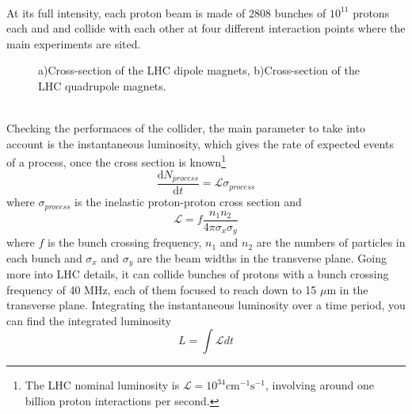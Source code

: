 \\
At its full intensity, each proton beam is made of 2808 bunches of $10^{11}$ protons each and and collide with each other at four different interaction points where the main experiments are sited.
\vspace{0.3cm}
\begin{figure}[t]
\caption{a)Cross-section of the LHC dipole magnets, b)Cross-section of the LHC quadrupole magnets.}
\end{figure}
\\Checking the performaces of the collider, the main parameter to take into account is the instantaneous luminosity, which gives the rate of expected events of a process, once the cross section is known\footnote{The LHC nominal luminosity is $\mathcal{L} = 10^{34}\text{cm}^{-1}\text{s}^{-1}$, involving around one billion proton interactions per second.}
\begin{equation}
\frac{\text{d}N_{process}}{\text{d}t} = \mathcal{L}\sigma_{process}
\end{equation}
where $\sigma_{process}$ is the inelastic proton-proton cross section and
\begin{equation}
\mathcal{L} = f \frac{n_1n_2}{4\pi \sigma_x\sigma_y}
\end{equation}
where $f$ is the bunch crossing frequency, $n_1$ and $n_2$ are the numbers of particles in each bunch and $\sigma_x$ and $\sigma_y$ are the beam widths in the transverse plane.
Going more into LHC details, it can collide bunches of protons with a bunch crossing frequency of 40 MHz, each of them focused to reach down to 15 $\mu\text{m}$ in the transverse plane\cite{Bruning}. Integrating the instantaneous luminosity over a time period, you can find the integrated luminosity
\begin{equation}
L = \int\mathcal{L}dt
\end{equation}

